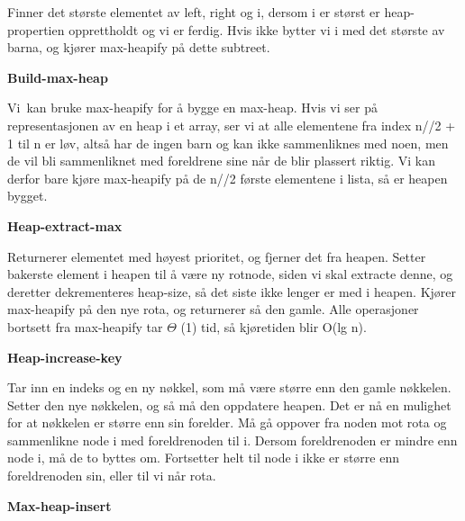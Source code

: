 \documentclass[12pt]{report}
\begin{document}
Finner det største elementet av left, right og i, dersom i er størst er heap-propertien opprettholdt og vi er ferdig. Hvis ikke bytter vi i med det største av barna, og kjører max-heapify på dette subtreet.\par


\vspace{\baselineskip}
\textbf{Build-max-heap}\par

Vi\ kan bruke max-heapify for å bygge en max-heap. Hvis vi ser på representasjonen av en heap i et array, ser vi at alle elementene fra index  n//2 + 1 til n er løv, altså har de ingen barn og kan ikke sammenliknes med noen, men de vil bli sammenliknet med foreldrene sine når de blir plassert riktig. Vi kan derfor bare kjøre max-heapify på de n//2 første elementene i lista, så er heapen bygget. \par


\vspace{\baselineskip}

\vspace{\baselineskip}

\vspace{\baselineskip}
\textbf{Heap-extract-max}\par

Returnerer elementet med høyest prioritet, og fjerner det fra heapen. Setter bakerste element i heapen til å være ny rotnode, siden vi skal extracte denne, og deretter dekrementeres heap-size, så det siste ikke lenger er med i heapen. Kjører max-heapify på den nye rota, og returnerer så den gamle. Alle operasjoner bortsett fra max-heapify tar $ \Theta $ (1) tid, så kjøretiden blir O(lg n). \par


\vspace{\baselineskip}
\textbf{Heap-increase-key}\par

Tar inn en indeks og en ny nøkkel, som må være større enn den gamle nøkkelen. Setter den nye nøkkelen, og så må den oppdatere heapen. Det er nå en mulighet for at nøkkelen er større enn sin forelder. Må gå oppover fra noden mot rota og sammenlikne node i med foreldrenoden til i. Dersom foreldrenoden er mindre enn node i, må de to byttes om. Fortsetter helt til node i ikke er større enn foreldrenoden sin, eller til vi når rota. \par


\vspace{\baselineskip}
\textbf{Max-heap-insert}\par
\end{document}

